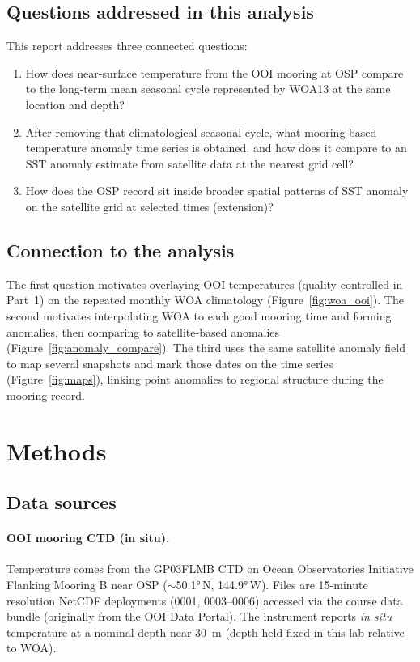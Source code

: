 \documentclass[11pt,letterpaper]{article}
\begin{document}
\subsection*{Questions addressed in this analysis}
This report addresses three connected questions:
\begin{enumerate}
  \item How does near-surface temperature from the OOI mooring at OSP compare to the long-term mean seasonal cycle represented by WOA13 at the same location and depth?
  \item After removing that climatological seasonal cycle, what mooring-based temperature anomaly time series is obtained, and how does it compare to an SST anomaly estimate from satellite data at the nearest grid cell?
  \item How does the OSP record sit inside broader spatial patterns of SST anomaly on the satellite grid at selected times (extension)?
\end{enumerate}

\subsection*{Connection to the analysis}
The first question motivates overlaying OOI temperatures (quality-controlled in Part~1) on the repeated monthly WOA climatology (Figure~\ref{fig:woa_ooi}). The second motivates interpolating WOA to each good mooring time and forming anomalies, then comparing to satellite-based anomalies (Figure~\ref{fig:anomaly_compare}). The third uses the same satellite anomaly field to map several snapshots and mark those dates on the time series (Figure~\ref{fig:maps}), linking point anomalies to regional structure during the mooring record.

\section{Methods}

\subsection{Data sources}

\paragraph{OOI mooring CTD (in situ).}
Temperature comes from the GP03FLMB CTD on Ocean Observatories Initiative Flanking Mooring B near OSP ($\sim$\ang{50.1}\,N, \ang{144.9}\,W). Files are 15-minute resolution NetCDF deployments (0001, 0003--0006) accessed via the course data bundle (originally from the OOI Data Portal). The instrument reports \emph{in situ} temperature at a nominal depth near \SI{30}{\meter} (depth held fixed in this lab relative to WOA).
\end{document}
